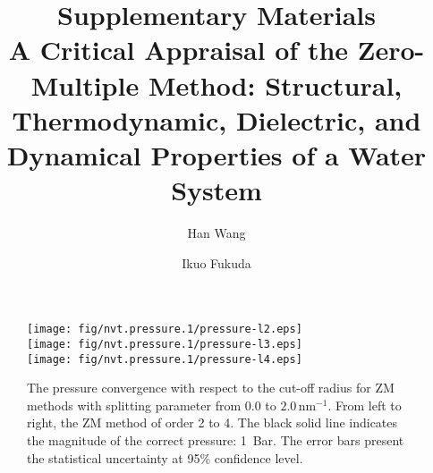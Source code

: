 \documentclass[aip,jcp,a4paper,reprint,unsortedaddress,onecolumn,fleqn]{revtex4}
\begin{document}
\title{\textbf{Supplementary Materials}\\
  A Critical Appraisal of the Zero-Multiple Method: Structural,
Thermodynamic, Dielectric, and Dynamical Properties of a Water System}
\author{Han Wang}
\author{Ikuo Fukuda}

\begin{abstract}
\end{abstract}

\maketitle
{}


\begin{figure}[]
\centering
\texttt{[image: fig/nvt.pressure.1/pressure-l2.eps]}\\
\texttt{[image: fig/nvt.pressure.1/pressure-l3.eps]}\\
\texttt{[image: fig/nvt.pressure.1/pressure-l4.eps]}
\caption{The pressure convergence with respect to the cut-off radius for ZM
methods with splitting parameter from $0.0$ to $2.0\,\text{nm}^{-1}$. From
left to right, the ZM method of order 2 to 4. The black
solid line indicates the magnitude of the correct pressure: 1~Bar. The error
bars present the statistical uncertainty at 95\% confidence level.}
\label{fig:pres-l1}
\end{figure}
\end{document}
